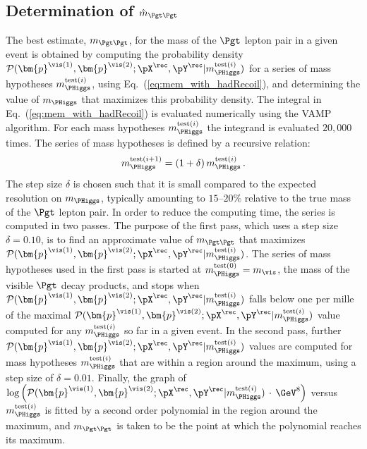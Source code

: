 \subsection{Determination of $\hat{m}_{\Pgt\Pgt}$}
\label{sec:mem_numericalMaximization}

The best estimate, $m_{\Pgt\Pgt}$, for the mass of the $\Pgt$ lepton pair in a given event
is obtained by computing the probability density $\mathcal{P}(\bm{p}^{\vis(1)},\bm{p}^{\vis(2)};\pX^{\rec},\pY^{\rec}|m_{\PHiggs}^{\textrm{test}(i)})$ 
for a series of mass hypotheses $m_{\PHiggs}^{\textrm{test}(i)}$, using Eq.~(\ref{eq:mem_with_hadRecoil}), and determining the value of $m_{\PHiggs}$ that maximizes this probability density.
The integral in Eq.~(\ref{eq:mem_with_hadRecoil}) is evaluated numerically using the VAMP algorithm.
For each mass hypotheses $m_{\PHiggs}^{\textrm{test}(i)}$ the integrand is evaluated $20,000$ times.
The series of mass hypotheses is defined by a recursive relation: 
\begin{equation}
m_{\PHiggs}^{\textrm{test}(i + 1)} = (1 + \delta) \,  m_{\PHiggs}^{\textrm{test}(i)} \, .
\label{eq:mTauTau_step_size}
\end{equation}
The step size $\delta$ is chosen such that it is small compared to the
expected resolution on $m_{\PHiggs}$,
typically amounting to $15$--$20\%$ relative to the true mass of the $\Pgt$ lepton pair.
In order to reduce the computing time, the series is computed in two passes.
The purpose of the first pass, which uses a step size $\delta = 0.10$, is to find an approximate value of $m_{\Pgt\Pgt}$
that maximizes $\mathcal{P}(\bm{p}^{\vis(1)},\bm{p}^{\vis(2)};\pX^{\rec},\pY^{\rec}|m_{\PHiggs}^{\textrm{test}(i)})$.
The series of mass hypotheses used in the first pass is started at $m_{\PHiggs}^{\textrm{test}(0)} = m_{\vis}$,
the mass of the visible $\Pgt$ decay products, 
and stops when $\mathcal{P}(\bm{p}^{\vis(1)},\bm{p}^{\vis(2)};\pX^{\rec},\pY^{\rec}|m_{\PHiggs}^{\textrm{test}(i)})$ falls below one per mille 
of the maximal $\mathcal{P}(\bm{p}^{\vis(1)},\bm{p}^{\vis(2)};\pX^{\rec},\pY^{\rec}|m_{\PHiggs}^{\textrm{test}(i)})$ value
computed for any $m_{\PHiggs}^{\textrm{test}(i)}$ so far in a given event.
In the second pass, further $\mathcal{P}(\bm{p}^{\vis(1)},\bm{p}^{\vis(2)};\pX^{\rec},\pY^{\rec}|m_{\PHiggs}^{\textrm{test}(i)})$ values 
are computed for mass hypotheses $m_{\PHiggs}^{\textrm{test}(i)}$ that are within a region around the maximum,
using a step size of $\delta = 0.01$.
Finally, the graph of $\log \left( \mathcal{P}(\bm{p}^{\vis(1)},\bm{p}^{\vis(2)};\pX^{\rec},\pY^{\rec}|m_{\PHiggs}^{\textrm{test}(i)}) \, \cdot \, \mbox{\GeV}^{8} \right)$ 
versus $m_{\PHiggs}^{\textrm{test}(i)}$ is fitted by a second order polynomial
in the region around the maximum,
and $m_{\Pgt\Pgt}$ is taken to be the point at which the polynomial reaches its maximum.
